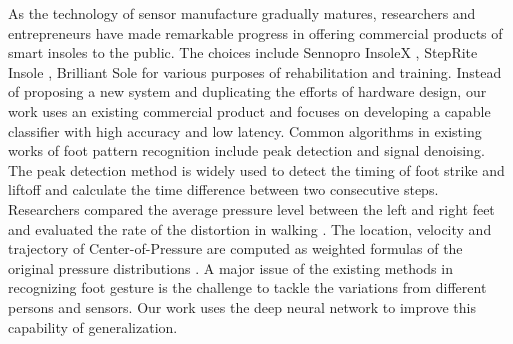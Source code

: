 \documentclass[review]{vgtc}                 %
\begin{document}
As the technology of sensor manufacture gradually matures, researchers and entrepreneurs have made remarkable progress in offering commercial products of smart insoles  to the public.
The choices include Sennopro InsoleX \cite{wearable2016}, StepRite Insole \cite{roden2014development}, Brilliant Sole \cite{virtual} for various purposes of rehabilitation and training.
Instead of proposing a new system and duplicating the efforts of hardware design, our work uses an existing commercial product and focuses on developing a capable classifier with high accuracy and low latency.
Common algorithms in existing works of foot pattern recognition include peak detection and signal denoising. 
The peak detection method \cite{mladenov2009step,tumkur2012modeling,cho2017design} is widely used to detect the timing of foot strike and liftoff and calculate the time difference between two consecutive steps. 
Researchers compared the average pressure level between the left and right feet and evaluated the rate of the distortion in walking \cite{cho2017design}. 
The location, velocity and trajectory of Center-of-Pressure are computed as weighted formulas of the original pressure distributions \cite{lin2016smart}.
A major issue of the existing methods in recognizing foot gesture is the challenge to tackle the variations from different persons and sensors.
Our work uses the deep neural network to improve this capability of generalization.

\end{document}
